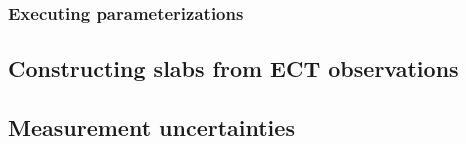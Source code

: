 \documentclass[hess, manuscript]{copernicus}
\begin{document}

\subsubsection{Executing parameterizations}



\subsection{Constructing slabs from ECT observations}




\subsection{Measurement uncertainties}



\end{document}
